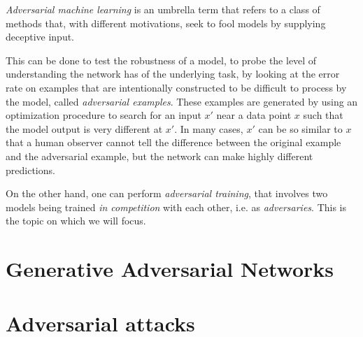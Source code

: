 
\emph{Adversarial machine learning} is an umbrella term that refers to a class of methods that, with different motivations, seek to fool models by supplying deceptive input.

This can be done to test the robustness of a model, to probe the level of understanding the network has of the underlying task, by looking at the error rate on examples that are intentionally constructed to be difficult to process by the model, called \emph{adversarial examples}. 
These examples are generated by using an optimization procedure to search for an input $x'$ near a data point $x$ such that the model output is very different at $x'$. In many cases, $x'$ can be so similar to $x$ that a human observer cannot tell the difference between the original example and the adversarial example, but the network can make highly different predictions.

On the other hand, one can perform \emph{adversarial training}, that involves two models being trained \emph{in competition} with each other, i.e. as \emph{adversaries}. This is the topic on which we will focus.

\section{Generative Adversarial Networks} 

\section{Adversarial attacks} 

